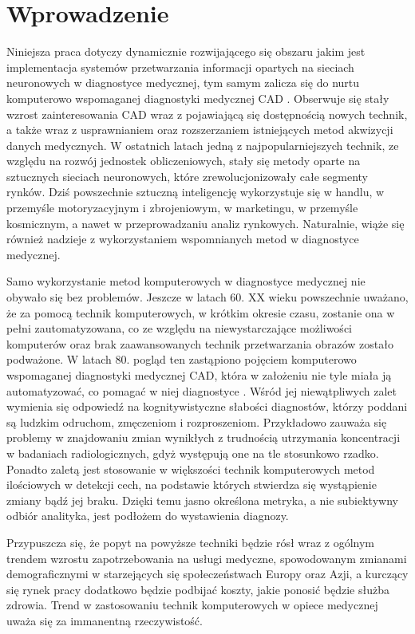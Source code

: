 \section{Wprowadzenie}
\label{sec:Introduction}

\par
Niniejsza praca dotyczy dynamicznie rozwijającego się obszaru jakim jest implementacja systemów przetwarzania informacji opartych na sieciach neuronowych w diagnostyce medycznej, tym samym zalicza się do nurtu komputerowo wspomaganej diagnostyki medycznej CAD . Obserwuje się stały wzrost zainteresowania CAD wraz z pojawiającą się dostępnością nowych technik, a także wraz z usprawnianiem oraz rozszerzaniem istniejących metod akwizycji danych medycznych. W ostatnich latach jedną z najpopularniejszych technik, ze względu na rozwój jednostek obliczeniowych, stały się metody oparte na sztucznych sieciach neuronowych, które zrewolucjonizowały całe segmenty rynków. Dziś powszechnie sztuczną inteligencję wykorzystuje się w handlu, w przemyśle motoryzacyjnym i zbrojeniowym, w marketingu, w przemyśle kosmicznym, a nawet w przeprowadzaniu analiz rynkowych. Naturalnie, wiąże się również nadzieje z wykorzystaniem wspomnianych metod w diagnostyce medycznej.
\par
Samo wykorzystanie metod komputerowych w diagnostyce medycznej nie obywało się bez problemów. Jeszcze w latach 60. XX wieku powszechnie uważano, że za pomocą technik komputerowych, w krótkim okresie czasu, zostanie ona w pełni zautomatyzowana, co ze względu na niewystarczające możliwości komputerów oraz brak zaawansowanych technik przetwarzania obrazów zostało podważone. W latach 80. pogląd ten zastąpiono pojęciem komputerowo wspomaganej diagnostyki medycznej CAD, która w założeniu nie tyle miała ją automatyzować, co pomagać w niej diagnostyce \cite{DOI2007198}. Wśród jej niewątpliwych zalet wymienia się odpowiedź na kognitywistyczne słabości diagnostów, którzy poddani są ludzkim odruchom, zmęczeniom i rozproszeniom. Przykładowo zauważa się problemy w znajdowaniu zmian wynikłych z trudnością utrzymania koncentracji w badaniach radiologicznych, gdyż występują one na tle stosunkowo rzadko\cite{CADPrzelaskowski2010}. Ponadto zaletą jest stosowanie w większości technik komputerowych metod ilościowych w detekcji cech, na podstawie których stwierdza się wystąpienie zmiany bądź jej braku. Dzięki temu jasno określona metryka, a nie subiektywny odbiór analityka, jest podłożem do wystawienia diagnozy.
\par
Przypuszcza się, że popyt na powyższe techniki będzie rósł wraz z ogólnym trendem wzrostu zapotrzebowania na usługi medyczne, spowodowanym zmianami demograficznymi w starzejących się społeczeństwach Europy oraz Azji, a kurczący się rynek pracy dodatkowo będzie podbijać koszty, jakie ponosić będzie służba zdrowia. Trend w zastosowaniu technik komputerowych w opiece medycznej uważa się za immanentną rzeczywistość.
